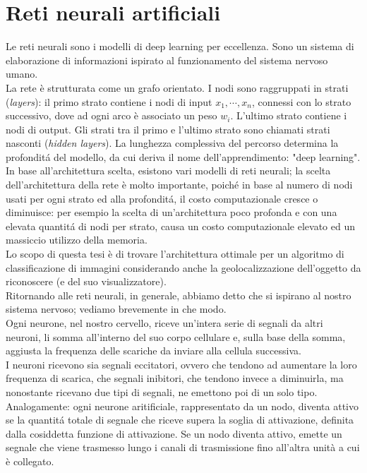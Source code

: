 \documentclass[a4paper,12pt]{report}
\begin{document}
\chapter{Reti neurali artificiali}
Le reti neurali sono i modelli di deep learning per eccellenza. Sono un sistema di elaborazione di informazioni ispirato al funzionamento del sistema nervoso umano.\\
La rete \`e strutturata come un grafo orientato. I nodi sono raggruppati in strati (\textit{layers}): il primo strato contiene i nodi di input  $x_1,\cdots,x_n$, connessi con lo strato successivo, dove ad ogni arco \`e associato un peso $w_i$. L'ultimo strato contiene i nodi di output. Gli strati tra il primo e l'ultimo strato sono chiamati strati nasconti (\textit{hidden layers}). La lunghezza complessiva del percorso determina la profondit\'{a} del modello, da cui deriva il nome dell'apprendimento: "deep learning".\\
In base all'architettura scelta, esistono vari modelli di  reti neurali;
la scelta dell'architettura della rete \`e molto importante, poich\'{e} in base al numero di nodi usati per ogni strato ed alla profondit\'{a}, il costo computazionale cresce o diminuisce: per esempio la scelta di un'architettura poco profonda e con una elevata quantit\'{a} di nodi per strato, causa un costo computazionale elevato ed un massiccio utilizzo della memoria.\\
Lo scopo di questa tesi \`e di trovare l'architettura ottimale per un algoritmo di classificazione di immagini considerando anche la geolocalizzazione dell'oggetto da riconoscere (e del suo visualizzatore). \\ %
Ritornando alle reti neurali, in generale, abbiamo detto che si ispirano al nostro sistema nervoso; vediamo brevemente in che modo.\\
Ogni neurone, nel nostro cervello, riceve un'intera serie di segnali da altri neuroni, li somma all'interno del suo corpo cellulare e, sulla base della somma, aggiusta la frequenza delle scariche da inviare alla cellula successiva.\\
I neuroni ricevono sia segnali eccitatori, ovvero che tendono ad aumentare la loro frequenza di scarica, che segnali inibitori, che tendono invece a diminuirla, ma nonostante ricevano due tipi di segnali, ne emettono poi di un solo tipo. Analogamente: ogni neurone aritificiale, rappresentato da un nodo, diventa attivo se la quantit\'{a} totale di segnale che riceve supera la soglia di attivazione, definita dalla cosiddetta funzione di attivazione. Se un nodo diventa attivo, emette un segnale che viene trasmesso lungo i canali di trasmissione fino all'altra unit\`{a} a cui \`e collegato.\\
\end{document}
